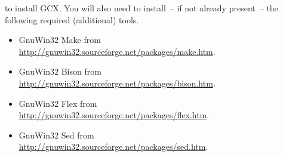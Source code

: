 \noindent to install GCX. You will also need to install~-- if not already present~-- the following required (additional) tools.
\begin{itemize}
  \setlength{\itemsep}{0pt}
  \item GnuWin32 Make from \\
        \href{http://gnuwin32.sourceforge.net/packages/make.htm}{http://gnuwin32.sourceforge.net/packages/make.htm}.
  \item GnuWin32 Bison from \\
        \href{http://gnuwin32.sourceforge.net/packages/bison.htm}{http://gnuwin32.sourceforge.net/packages/bison.htm}.
  \item GnuWin32 Flex from \\
        \href{http://gnuwin32.sourceforge.net/packages/flex.htm}{http://gnuwin32.sourceforge.net/packages/flex.htm}.
  \item GnuWin32 Sed from \\
        \href{http://gnuwin32.sourceforge.net/packages/sed.htm}{http://gnuwin32.sourceforge.net/packages/sed.htm}.
\end{itemize}


